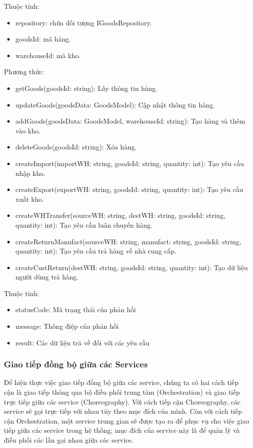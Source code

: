 Thuộc tính:
\begin{itemize}
	\item repository: chứa đối tượng IGoodsRepository.
	\item goodsId: mã hàng.
	\item warehouseId: mã kho.
\end{itemize}
Phương thức:
\begin{itemize}
	\item getGoods(goodsId: string): Lấy thông tin hàng.
	\item updateGoods(goodsData: GoodsModel): Cập nhật thông tin hàng.
	\item addGoods(goodsData: GoodsModel, warehouseId: string): Tạo hàng và thêm vào kho.
	\item deleteGoods(goodsId: string): Xóa hàng.
	\item createImport(importWH: string, goodsId: string, quantity: int): Tạo yêu cầu nhập kho.
	\item createExport(exportWH: string, goodsId: string, quantity: int): Tạo yêu cầu xuất kho.
	\item createWHTransfer(sourceWH: string, destWH: string, goodsId: string, quantity: int): Tạo yêu cầu luân chuyển hàng.
	\item createReturnManufact(sourceWH: string, manufact: string, goodsId: string, quantity: int): Tạo yêu cầu trả hàng về nhà cung cấp.
	\item createCustReturn(destWH: string, goodsId: string, quantity: int): Tạo dữ liệu người dùng trả hàng.
\end{itemize}

Thuộc tính:
\begin{itemize}
	\item statusCode: Mã trạng thái của phản hồi
	\item message: Thông điệp của phản hồi
	\item result: Các dữ liệu trả về đối với các yêu cầu
\end{itemize}


\newpage



\subsubsection{Giao tiếp đồng bộ giữa các Services}

\hspace*{0.5cm} Để hiện thực việc giao tiếp đồng bộ giữa các service, chúng ta có hai cách tiếp cận là giao tiếp thông qua bộ điều phối trung tâm (Orchestration) và giao tiếp trực tiếp giữa các service (Choreography). Với cách tiếp cận Choreography, các service sẽ gọi trực tiếp với nhau tùy theo mục đích của mình. Còn với cách tiếp cận Orchestration, một service trung gian sẽ được tạo ra để phục vụ cho việc giao tiếp giữa các service trong hệ thống; mục đích của service này là để quản lý và điều phối các lần gọi nhau giữa các service.\\

